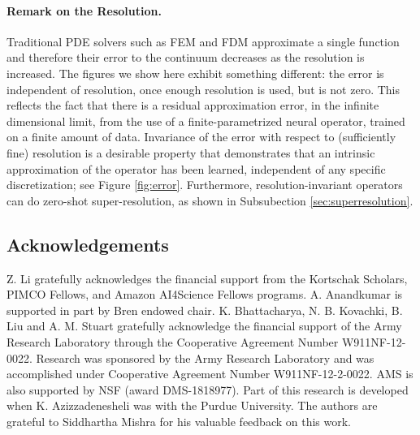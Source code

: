 \documentclass[twoside,12pt]{ctexart}
\begin{document}
\paragraph{Remark on the Resolution.}
Traditional PDE solvers such as FEM and FDM approximate a single function and therefore their error to the continuum decreases as the resolution is increased. The figures we show here exhibit
something different: the error is independent of resolution,
once enough resolution is used, but is not zero.
This reflects the fact that there
is a residual approximation error, in the infinite dimensional
limit, from the use of a finite-parametrized neural
operator, trained on a finite amount of data. Invariance of the error with respect to
(sufficiently fine) resolution is a desirable property that
demonstrates that an intrinsic approximation of the
operator has been learned, independent of any specific
discretization; see Figure \ref{fig:error}. Furthermore, resolution-invariant operators can do zero-shot super-resolution, as shown in Subsubection \ref{sec:superresolution}.
















%
%


%
%






\newpage

\subsection*{Acknowledgements}
Z. Li gratefully acknowledges the financial support from the Kortschak Scholars, PIMCO Fellows, and Amazon AI4Science Fellows programs.
A. Anandkumar is supported in part by Bren endowed chair. 
K. Bhattacharya, N. B. Kovachki, B. Liu and A. M. Stuart gratefully acknowledge the financial support of the Army Research Laboratory through the Cooperative Agreement Number W911NF-12-0022. Research was sponsored by the Army Research Laboratory and was accomplished under Cooperative Agreement Number W911NF-12-2-0022. 
AMS is also supported by NSF (award DMS-1818977). 
Part of this research is developed when K. Azizzadenesheli was with the Purdue University. The authors are grateful to Siddhartha Mishra for his valuable feedback on this work.
\end{document}
